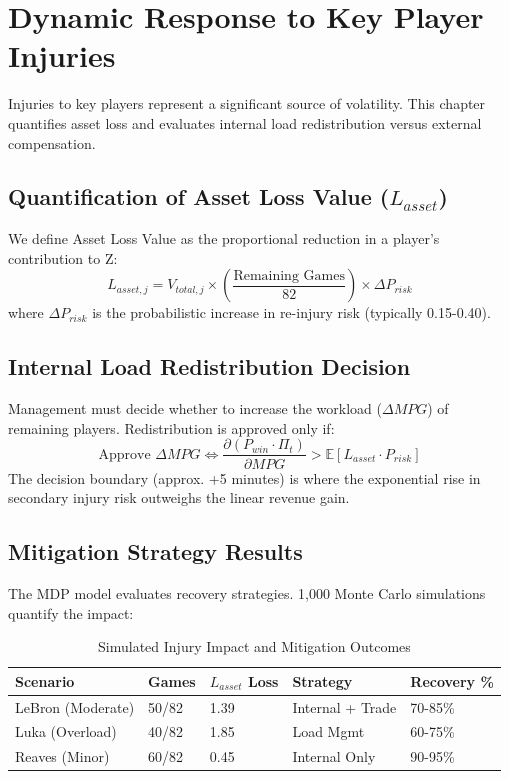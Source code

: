 \documentclass[12pt]{article}
\begin{document}
\section{Dynamic Response to Key Player Injuries}
Injuries to key players represent a significant source of volatility. This chapter quantifies asset loss and evaluates internal load redistribution versus external compensation.

\subsection{Quantification of Asset Loss Value ($L_{asset}$)}
We define Asset Loss Value as the proportional reduction in a player's contribution to Z:
\begin{equation}
L_{asset,j} = V_{total,j} \times \left( \frac{\text{Remaining Games}}{82} \right) \times \Delta P_{risk}
\end{equation}
where $\Delta P_{risk}$ is the probabilistic increase in re-injury risk (typically 0.15-0.40).

\subsection{Internal Load Redistribution Decision}
Management must decide whether to increase the workload ($\Delta MPG$) of remaining players. Redistribution is approved only if:
\begin{equation}
\text{Approve } \Delta MPG \iff \frac{\partial (P_{win} \cdot \Pi_t)}{\partial MPG} > \mathbb{E}[L_{asset} \cdot P_{risk}]
\end{equation}
The decision boundary (approx. +5 minutes) is where the exponential rise in secondary injury risk outweighs the linear revenue gain.

\subsection{Mitigation Strategy Results}
The MDP model evaluates recovery strategies. 1,000 Monte Carlo simulations quantify the impact:

\begin{table}[H]
\centering
\caption{Simulated Injury Impact and Mitigation Outcomes}
\begin{tabular}{lllll}
\toprule
\textbf{Scenario} & \textbf{Games} & \textbf{$L_{asset}$ Loss} & \textbf{Strategy} & \textbf{Recovery \%} \\
\midrule
LeBron (Moderate) & 50/82 & 1.39 & Internal + Trade & 70-85\% \\
Luka (Overload) & 40/82 & 1.85 & Load Mgmt & 60-75\% \\
Reaves (Minor) & 60/82 & 0.45 & Internal Only & 90-95\% \\
\bottomrule
\end{tabular}
\end{table}
\end{document}
